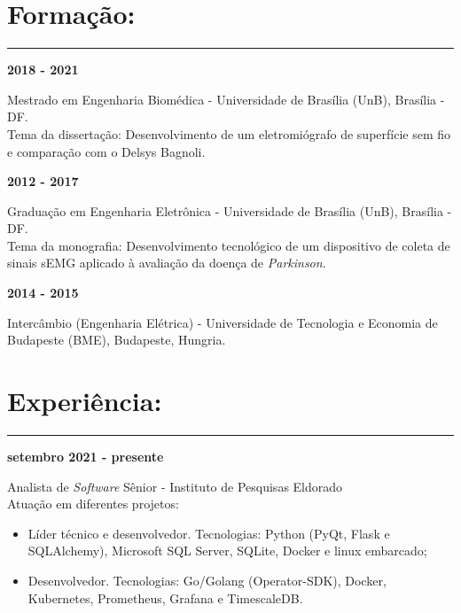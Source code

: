 \documentclass[11pt]{article}
\begin{document}
\section{Formação:}
\hrule \vspace{0.1cm}

\textbf{2018 - 2021}
\begin{addmargin}{0.5cm}
Mestrado em Engenharia Biomédica - Universidade de Brasília (UnB), Brasília - DF.\\ 
Tema da dissertação: Desenvolvimento de um eletromiógrafo de superfície sem fio e
comparação com o Delsys Bagnoli.\\
\end{addmargin}

\textbf{2012 - 2017}
\begin{addmargin}{0.5cm}
Graduação em Engenharia Eletrônica - Universidade de Brasília (UnB), Brasília - DF. \\
Tema da monografia: Desenvolvimento tecnológico de um dispositivo de coleta
de sinais sEMG aplicado à avaliação da doença de \textit{Parkinson}.\\
\end{addmargin}

\textbf{2014 - 2015} 
\begin{addmargin}{0.5cm}
Intercâmbio (Engenharia Elétrica) - Universidade de Tecnologia e Economia de Budapeste (BME), Budapeste, Hungria. 
\end{addmargin}

\section{Experiência:}
\hrule \vspace{0.1cm}

\textbf{setembro 2021 - presente}
\begin{addmargin}{0.5cm}
Analista de \textit{Software} Sênior - Instituto de Pesquisas Eldorado\\
Atuação em diferentes projetos:
\begin{itemize}
    \item Líder técnico e desenvolvedor. Tecnologias: Python (PyQt, Flask e SQLAlchemy), Microsoft SQL Server, SQLite, Docker e linux embarcado;
    \item Desenvolvedor. Tecnologias: Go/Golang (Operator-SDK), Docker, Kubernetes, Prometheus, Grafana e TimescaleDB. \\
\end{itemize}
\end{addmargin}
\end{document}
